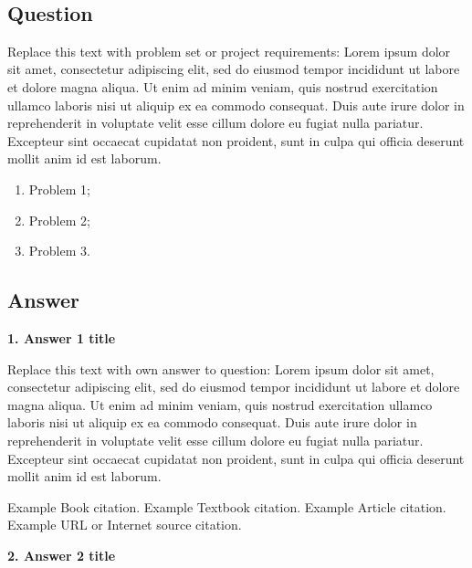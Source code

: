 \documentclass[a4paper, 11pt]{article}
\begin{document}
\citetrackerfalse

\ 

\footnotesize
\slshape
\subsection*{Question}

Replace this text with problem set or project requirements: Lorem ipsum dolor sit amet, consectetur adipiscing elit, sed do eiusmod tempor incididunt ut labore et dolore magna aliqua. Ut enim ad minim veniam, quis nostrud exercitation ullamco laboris nisi ut aliquip ex ea commodo consequat. Duis aute irure dolor in reprehenderit in voluptate velit esse cillum dolore eu fugiat nulla pariatur. Excepteur sint occaecat cupidatat non proident, sunt in culpa qui officia deserunt mollit anim id est laborum.

\begin{enumerate}
    \item Problem 1;
    \item Problem 2;
    \item Problem 3.
\end{enumerate}


\normalsize
\normalfont
\vspace{0.5cm}
\subsection*{Answer}


\textbf{1. Answer 1 title}  %

Replace this text with own answer to question: Lorem ipsum dolor sit amet, consectetur adipiscing elit, sed do eiusmod tempor incididunt ut labore et dolore magna aliqua. Ut enim ad minim veniam, quis nostrud exercitation ullamco laboris nisi ut aliquip ex ea commodo consequat. Duis aute irure dolor in reprehenderit in voluptate velit esse cillum dolore eu fugiat nulla pariatur. Excepteur sint occaecat cupidatat non proident, sunt in culpa qui officia deserunt mollit anim id est laborum.

Example Book \autocite{Shreve2} citation. Example Textbook \autocite{WQUDFT5} citation.
Example Article \autocite{Tapa2016} citation.
Example URL or Internet source \autocite{Investopedia} citation.


\vspace{1cm} %
\textbf{2. Answer 2 title}  %
\end{document}
